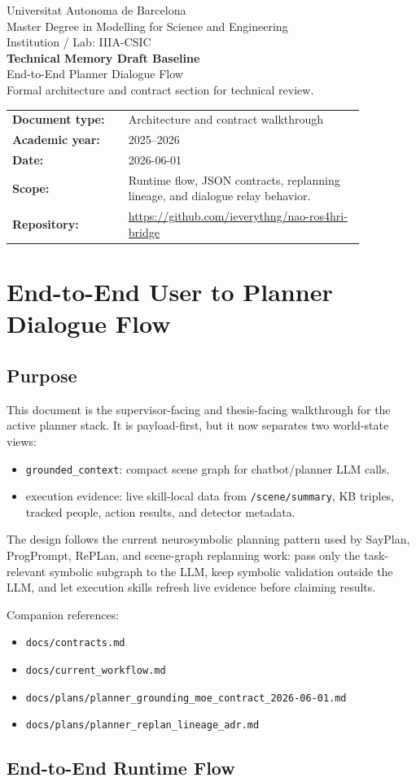 \documentclass[12pt,a4paper]{article}
\newcommand{\code}[1]{\texttt{#1}}
\newcommand{\formalcover}[4]{%
\begin{titlepage}
\centering
\vspace*{1.2cm}
{\Large Universitat Autonoma de Barcelona}\\[4pt]
{\large Master Degree in Modelling for Science and Engineering}\\[4pt]
{\large Institution / Lab: IIIA-CSIC}\\[2.0cm]
{\Huge\bfseries #1}\\[0.35cm]
{\Large #2}\\[1.5cm]
{\large Formal architecture and contract section for technical review.}\\[2.0cm]
\begin{tabular}{>{\bfseries}p{0.28\linewidth}p{0.58\linewidth}}
Document type: & Architecture and contract walkthrough\\
Academic year: & 2025--2026\\
Date: & #3\\
Scope: & #4\\
Repository: & \url{https://github.com/ieverythng/nao-ros4hri-bridge}\\
\end{tabular}
\vfill
\end{titlepage}}
\begin{document}
\formalcover{Technical Memory Draft Baseline}{End-to-End Planner Dialogue Flow}{2026-06-01}{Runtime flow, JSON contracts, replanning lineage, and dialogue relay behavior.}

\section{End-to-End User to Planner Dialogue Flow}

\subsection{Purpose}

This document is the supervisor-facing and thesis-facing walkthrough for the active planner stack. It is payload-first, but it now separates two world-state views:

\begin{itemize}
\item \code{grounded\_context}: compact scene graph for chatbot/planner LLM calls.
\item execution evidence: live skill-local data from \code{/scene/summary}, KB triples, tracked people, action results, and detector metadata.
\end{itemize}

The design follows the current neurosymbolic planning pattern used by SayPlan, ProgPrompt, RePLan, and scene-graph replanning work: pass only the task-relevant symbolic subgraph to the LLM, keep symbolic validation outside the LLM, and let execution skills refresh live evidence before claiming results.

Companion references:

\begin{itemize}
\item \code{docs/contracts.md}
\item \code{docs/current\_workflow.md}
\item \code{docs/plans/planner\_grounding\_moe\_contract\_2026-06-01.md}
\item \code{docs/plans/planner\_replan\_lineage\_adr.md}
\end{itemize}



\subsection{End-to-End Runtime Flow}
\end{document}
